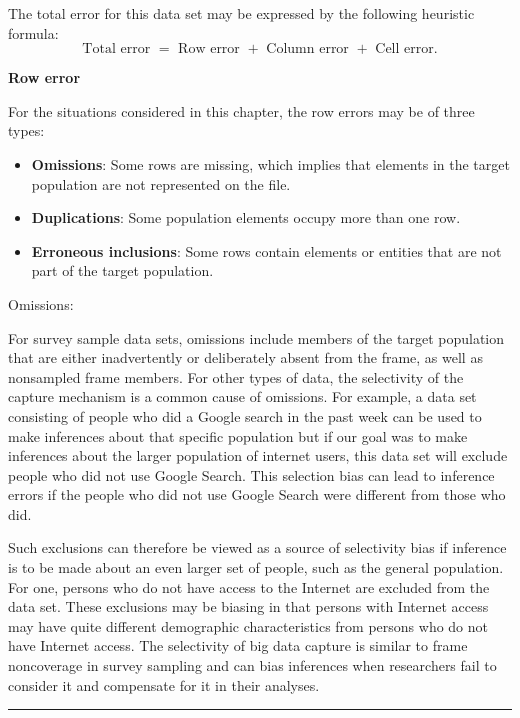 \documentclass[]{krantz}
\begin{document}
The total error for this data set may be expressed by the following
heuristic formula:
\[\text{Total error } =\text{ Row error } + \text{ Column error }
+ \text{ Cell error}.\]

\textbf{Row error}

For the situations considered in this chapter, the row errors may be of
three types:

\begin{itemize}
\item
  \textbf{Omissions}: Some rows are missing, which implies that elements
  in the target population are not represented on the file.
\item
  \textbf{Duplications}: Some population elements occupy more than one
  row.
\item
  \textbf{Erroneous inclusions}: Some rows contain elements or entities
  that are not part of the target population.
\end{itemize}

Omissions:

For survey sample data sets, omissions include members of the target
population that are either inadvertently or deliberately absent from the
frame, as well as nonsampled frame members. For other types of data, the
selectivity of the capture mechanism is a common cause of omissions. For
example, a data set consisting of people who did a Google search in the
past week can be used to make inferences about that specific population
but if our goal was to make inferences about the larger population of
internet users, this data set will exclude people who did not use Google
Search. This selection bias can lead to inference errors if the people
who did not use Google Search were different from those who did.

Such exclusions can therefore be viewed as a source of selectivity bias
if inference is to be made about an even larger set of people, such as
the general population. For one, persons who do not have access to the
Internet are excluded from the data set. These exclusions may be biasing
in that persons with Internet access may have quite different
demographic characteristics from persons who do not have Internet
access. The selectivity of big data capture is similar to frame
noncoverage in survey sampling and can bias inferences when researchers
fail to consider it and compensate for it in their analyses.

\begin{center}\rule{0.5\linewidth}{\linethickness}\end{center}
\end{document}

